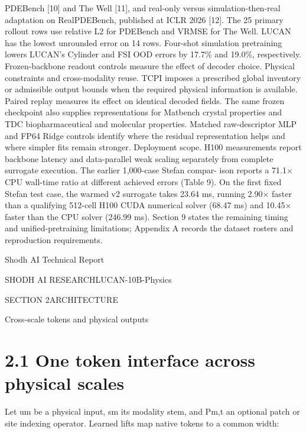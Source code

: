 \documentclass[11pt]{article}
\begin{document}
PDEBench [10] and The Well [11], and real-only versus simulation-then-real adaptation
on RealPDEBench, published at ICLR 2026 [12]. The 25 primary rollout rows use relative
L2 for PDEBench and VRMSE for The Well. LUCAN has the lowest unrounded error on
14 rows. Four-shot simulation pretraining lowers LUCAN’s Cylinder and FSI OOD errors
by 17.7\% and 19.0\%, respectively. Frozen-backbone readout controls measure the effect of
decoder choice.
Physical constraints and cross-modality reuse. TCPI imposes a prescribed global
inventory or admissible output bounds when the required physical information is available.
Paired replay measures its effect on identical decoded fields. The same frozen checkpoint
also supplies representations for Matbench crystal properties and TDC biopharmaceutical
and molecular properties. Matched raw-descriptor MLP and FP64 Ridge controls identify
where the residual representation helps and where simpler fits remain stronger.
Deployment scope. H100 measurements report backbone latency and data-parallel weak
scaling separately from complete surrogate execution. The earlier 1,000-case Stefan compar-
ison reports a 71.1\ensuremath{\times} CPU wall-time ratio at different achieved errors (Table 9). On the first
fixed Stefan test case, the warmed v2 surrogate takes 23.64 ms, running 2.90\ensuremath{\times} faster than
a qualifying 512-cell H100 CUDA numerical solver (68.47 ms) and 10.45\ensuremath{\times} faster than the
CPU solver (246.99 ms). Section 9 states the remaining timing and unified-pretraining
limitations; Appendix A records the dataset rosters and reproduction requirements.





\noindent Shodh AI Technical Report\par




\noindent SHODH AI RESEARCH\quad LUCAN-10B-Physics\par




\noindent SECTION 2\quad ARCHITECTURE\par


Cross-scale tokens and physical outputs


\section*{2.1 One token interface across physical scales}

Let um be a physical input, sm its modality stem, and Pm,t an optional patch or site indexing
operator. Learned lifts map native tokens to a common width:
\end{document}

